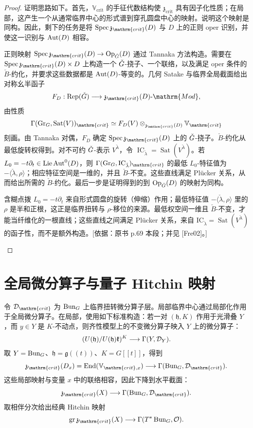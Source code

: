 \begin{proof}

证明思路如下。首先，$\mathbb V_{\mathrm{crit}}$ 的手征代数结构使 $\mathfrak z_{\mathrm{crit}}$ 具有因子化性质；在局部，这产生一个从通常临界中心的形式谱到穿孔圆盘中心的映射。说明这个映射是同构。因此，剩下的任务是将 $\Spec\mathfrak z_{\mathrm{crit}}(D)$ 与 $D$ 上的正则 oper 识别，并使这一识别与 $\operatorname{Aut}(D)$ 相容。

正则映射 $\Spec\mathfrak z_{\mathrm{crit}}(D)\to\Op_{\checkG}(D)$ 通过 Tannaka 方法构造。需要在 $\Spec\mathfrak z_{\mathrm{crit}}(D)\times D$ 上构造一个 $\check{G}$-挠子、一个联络，以及满足 oper 条件的 $\check B$-约化，并要求这些数据都是 $\operatorname{Aut}(D)$-等变的。几何 Satake 与临界全局截面给出对称幺半函子
\[F_D:\Rep(\checkG)\longrightarrow\mathfrak z_{\mathrm{crit}}(D)\text{-}\mathrm{Mod},\]
由性质
\[\Gamma(\Gr_G,\operatorname{Sat}(V))_{\mathrm{crit}}\simeq F_D(V)\otimes_{\mathfrak z_{\mathrm{crit}}(D)}\mathbb V_{\mathrm{crit}}\]
刻画。由 Tannaka 对偶，$F_D$ 确定 $\Spec\mathfrak z_{\mathrm{crit}}(D)$ 上的 $\check{G}$-挠子。$\check B$-约化从最低旋转权得到。对不可约 $\check{G}$-表示 $V^{\check\lambda}$，令 $\operatorname{IC}_{\check\lambda}=\operatorname{Sat}(V^{\check\lambda})$。若 $L_0=-t\partial_t\in\operatorname{Lie}\operatorname{Aut}^0(D)$，则 $\Gamma(\Gr_G,\operatorname{IC}_{\check\lambda})_{\mathrm{crit}}$ 的最低 $L_0$-特征值为 $-\langle\check\lambda,\rho\rangle$；相应特征空间是一维的，并且 $\check B$-不变。这些直线满足 Plücker 关系，从而给出所需的 $\check B$-约化。最后一步是证明得到的到 $\operatorname{Op}_{\check{G}}(D)$ 的映射为同构。

\begin{transnote}{含糊点拨}
$L_0=-t\partial_t$ 来自形式圆盘的旋转（伸缩）作用；最低特征值 $-\langle\check\lambda,\rho\rangle$ 里的 $\rho$ 是半和正根，这正是临界扭转与 $\rho$-移位的来源。最低权空间一维且 $\check B$-不变，才能当纤维化的一根直线；这些直线之间满足 Plücker 关系，来自 $\mathrm{IC}_{\check\lambda}=\operatorname{Sat}(V^{\check\lambda})$ 的函子性，而不是额外构造。[依据：原书 p.69 本段；并见 [Fre02]。]
\end{transnote}
\end{proof}
\section{全局微分算子与量子 Hitchin 映射}\label{sec:14.4}
令 $\cD_{\mathrm{crit}}$ 为 $\operatorname{Bun}_G$ 上临界扭转微分算子层。局部临界中心通过局部化作用于全局微分算子。在局部，使用如下标准构造：若一对 $(\mathfrak h,K)$ 作用于光滑叠 $Y$，而 $y\in Y$ 是 $K$-不动点，则齐性模型上的不变微分算子映入 $Y$ 上的微分算子：
\[(U(\mathfrak h)/U(\mathfrak h)\mathfrak k)^K\longrightarrow\Gamma(Y,\mathcal{D}_Y).\]
取 $Y=\operatorname{Bun}_G$、$\mathfrak h=\mathfrak g((t))$、$K=G[[t]]$，得到
\[\mathfrak z_{\mathrm{crit}}(D_x)=\End(\mathbb V_{\mathrm{crit},x})\longrightarrow\Gamma(\Bun_G,\cD_{\mathrm{crit}}).\]
这些局部映射与变量 $x$ 中的联络相容，因此下降到水平截面：
\[\mathfrak z_{\mathrm{crit}}(X)\longrightarrow\Gamma(\Bun_G,\cD_{\mathrm{crit}}).\]
取相伴分次给出经典 Hitchin 映射
\[\operatorname{gr}\mathfrak z_{\mathrm{crit}}(X)\longrightarrow\Gamma(T^*\Bun_G,\cO).\]

